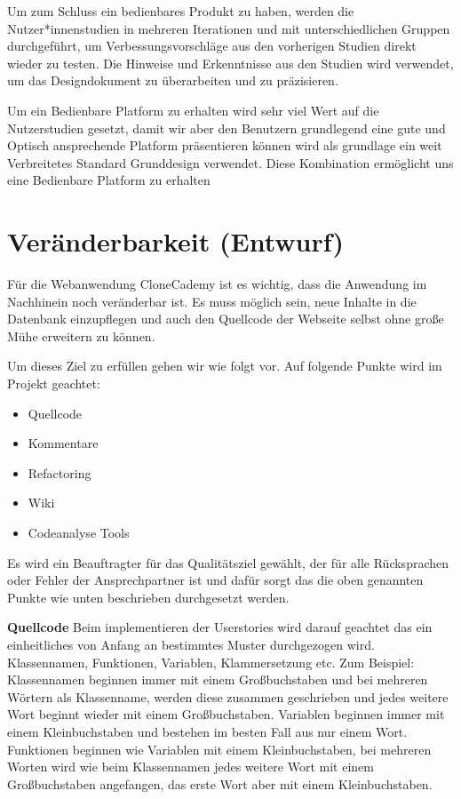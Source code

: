 \documentclass[accentcolor=tud0b,12pt,paper=a4]{tudreport}
\begin{document}
Um zum Schluss ein bedienbares Produkt zu haben, werden die Nutzer*innenstudien in mehreren Iterationen und mit unterschiedlichen Gruppen durchgeführt, um Verbessungsvorschläge aus den vorherigen Studien direkt wieder zu testen. Die Hinweise und Erkenntnisse aus den Studien wird verwendet, um das Designdokument zu überarbeiten und zu präzisieren.


Um ein Bedienbare Platform zu erhalten wird sehr viel Wert auf die Nutzerstudien gesetzt, damit wir aber den Benutzern grundlegend eine gute und Optisch ansprechende Platform präsentieren können wird als grundlage ein weit Verbreitetes Standard Grunddesign verwendet. Diese Kombination ermöglicht uns eine Bedienbare Platform zu erhalten
\section{Veränderbarkeit (Entwurf)}
Für die Webanwendung CloneCademy ist es wichtig, dass die Anwendung im Nachhinein noch veränderbar ist. Es muss möglich sein, neue Inhalte in die Datenbank einzupflegen und auch den Quellcode der Webseite selbst ohne große Mühe erweitern zu können.

Um dieses Ziel zu erfüllen gehen wir wie folgt vor. Auf folgende Punkte wird im Projekt geachtet:
\begin{itemize}
	\item Quellcode
	\item Kommentare
	\item Refactoring
	\item Wiki
	\item Codeanalyse Tools
\end{itemize}

Es wird ein Beauftragter für das Qualitätsziel gewählt, der für alle Rücksprachen oder Fehler der Ansprechpartner ist und dafür sorgt das die oben genannten Punkte wie unten beschrieben durchgesetzt werden.

\textbf{Quellcode}
Beim implementieren der Userstories wird darauf geachtet das ein einheitliches von Anfang an bestimmtes Muster durchgezogen wird. Klassennamen, Funktionen, Variablen, Klammersetzung etc. Zum Beispiel:
Klassennamen beginnen immer mit einem Großbuchstaben und bei mehreren Wörtern als Klassenname, werden diese zusammen geschrieben und jedes weitere Wort beginnt wieder mit einem Großbuchstaben.
Variablen beginnen immer mit einem Kleinbuchstaben und bestehen im besten Fall aus nur einem Wort.
Funktionen beginnen wie Variablen mit einem Kleinbuchstaben, bei mehreren Worten wird wie beim Klassennamen jedes weitere Wort mit einem Großbuchstaben angefangen, das erste Wort aber mit einem Kleinbuchstaben.
\end{document}
